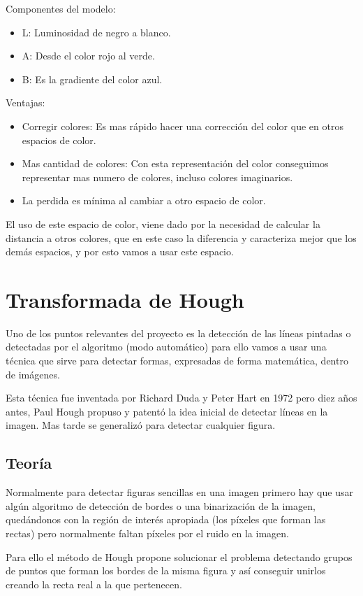 Componentes del modelo:
\begin{itemize}
	\item L: Luminosidad de negro a blanco.
	\item A: Desde el color rojo al verde.
	\item B: Es la gradiente del color azul.
\end{itemize}

Ventajas:
\begin{itemize}
\item Corregir colores: Es mas rápido hacer una corrección del color que en otros espacios de color.
\item Mas cantidad de colores: Con esta representación del color conseguimos representar mas numero de colores, incluso colores imaginarios.
\item La perdida es mínima al cambiar a otro espacio de color.
\end{itemize}

El uso de este espacio de color, viene dado por la necesidad de calcular la distancia a otros colores, que en este caso la diferencia y caracteriza mejor que los demás espacios, y por esto vamos a usar este espacio.
\section{Transformada de Hough }

Uno de los puntos relevantes del proyecto es la detección de las líneas pintadas o detectadas por el algoritmo (modo automático) para ello vamos a usar una técnica que sirve para detectar formas, expresadas de forma matemática, dentro de imágenes.

Esta técnica fue inventada por Richard Duda y Peter Hart en 1972 pero diez años antes, Paul Hough propuso y patentó \cite{pat:patHough} la idea inicial de detectar líneas en la imagen. Mas tarde se generalizó para detectar cualquier figura.

\subsection{Teoría}

Normalmente para detectar figuras sencillas en una imagen primero hay que usar algún algoritmo de detección de bordes o una binarización de la imagen, quedándonos con la región de interés apropiada (los píxeles que forman las rectas) pero normalmente faltan píxeles por el ruido en la imagen.

Para ello el método de Hough propone solucionar el problema detectando grupos de puntos que forman los bordes de la misma figura y así conseguir unirlos creando la recta real a la que pertenecen.

